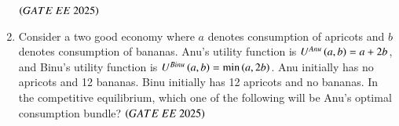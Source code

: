 \documentclass[journal,12pt,onecolumn]{IEEEtran}
\theoremstyle{remark}
\begin{document}
\begin{enumerate}
\hfill $\brak{GATE\ EE\ 2025}$
\begin{enumerate}
\end{enumerate}
 
\item Consider a two good economy where $a$ denotes consumption of apricots and $b$ denotes consumption of bananas. Anu's utility function is $U^{Anu} \left(a, b\right) = a + 2b$, and Binu's utility function is $U^{Binu} \left(a, b\right) = \min \left(a, 2b\right)$. Anu initially has no apricots and 12 bananas. Binu initially has 12 apricots and no bananas. In the competitive equilibrium, which one of the following will be Anu's optimal consumption bundle?
\hfill $\brak{GATE\ EE\ 2025}$
\begin{enumerate}
\end{enumerate}
 

\end{enumerate}
\end{document}
